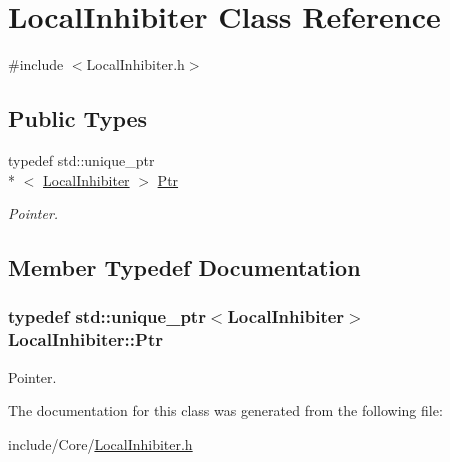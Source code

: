 \hypertarget{class_local_inhibiter}{\section{Local\-Inhibiter Class Reference}
\label{class_local_inhibiter}
}


{\ttfamily \#include $<$Local\-Inhibiter.\-h$>$}

\subsection*{Public Types}
\begin{DoxyCompactItemize}
\item 
typedef std\-::unique\-\_\-ptr\\*
$<$ \hyperlink{class_local_inhibiter}{Local\-Inhibiter} $>$ \hyperlink{class_local_inhibiter_adb0900eb28d67eb178802c68d307e070}{Ptr}
\begin{DoxyCompactList}\small\item\em Pointer. \end{DoxyCompactList}\end{DoxyCompactItemize}


\subsection{Member Typedef Documentation}
\hypertarget{class_local_inhibiter_adb0900eb28d67eb178802c68d307e070}{
\subsubsection[{Ptr}]{\setlength{\rightskip}{0pt plus 5cm}typedef std\-::unique\-\_\-ptr$<${\bf Local\-Inhibiter}$>$ {\bf Local\-Inhibiter\-::\-Ptr}}}\label{class_local_inhibiter_adb0900eb28d67eb178802c68d307e070}


Pointer. 



The documentation for this class was generated from the following file\-:\begin{DoxyCompactItemize}
\item 
include/\-Core/\hyperlink{_local_inhibiter_8h}{Local\-Inhibiter.\-h}\end{DoxyCompactItemize}
